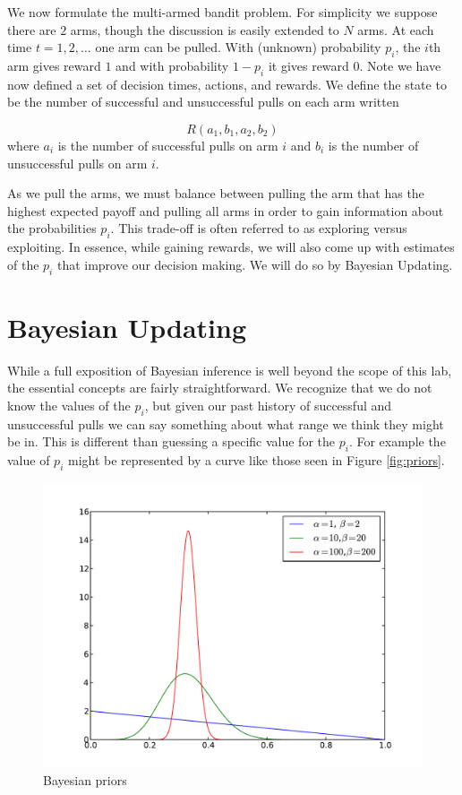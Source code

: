 We now formulate the multi-armed bandit problem.  For simplicity we suppose there are $2$ arms, though the discussion is easily extended to $N$ arms.  At each time $t= 1,2,\ldots$ one arm can be pulled.  With (unknown) probability $p_i$, the $i$th arm gives reward $1$ and with probability $1-p_i$ it gives reward $0$.  Note we have now defined a set of decision times, actions, and rewards.  We define the state to be the number of successful and unsuccessful pulls on each arm written

\begin{equation}\label{state}
R(a_1,b_1,a_2,b_2)
\end{equation}
\noindent
where $a_i$ is the number of successful pulls on arm $i$ and $b_i$ is the number of unsuccessful pulls on arm $i$.

As we pull the arms, we must balance between pulling the arm that has the highest expected payoff and pulling all arms in order to gain information about the probabilities $p_i$.  This trade-off is often referred to as exploring versus exploiting.  In essence, while gaining rewards, we will also come up with estimates of the $p_i$ that improve our decision making.  We will do so by Bayesian Updating.

\section*{Bayesian Updating}
While a full exposition of Bayesian inference is well beyond the scope of this lab, the essential concepts are fairly straightforward.  We recognize that we do not know the values of the $p_i$, but given our past history of successful and unsuccessful pulls we can say something about what range we think they might be in. This is different than guessing a specific value for the $p_i$.  For example the value of $p_i$ might be represented by a curve like those seen in Figure \ref{fig:priors}.

\begin{figure}
\begin{center}
        \includegraphics[width=\textwidth]{./Algorithms/MarkDecProc/priors.pdf}
        \caption{Bayesian priors}
\end{center}
\end{figure}\label{fig:priors}

